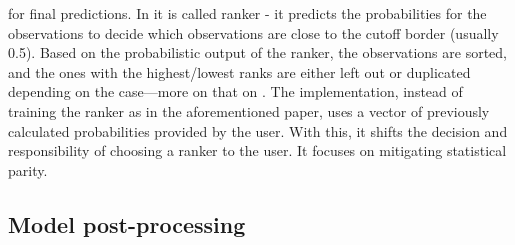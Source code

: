 \begin{itemize}
  for final predictions. In \citet{kamiran} it is called ranker - it
  predicts the probabilities for the observations to decide which
  observations are close to the cutoff border (usually 0.5). Based on
  the probabilistic output of the ranker, the observations are sorted,
  and the ones with the highest/lowest ranks are either left out or
  duplicated depending on the case---more on that on \citet{kamiran}.
  The  implementation, instead of training the ranker as
  in the aforementioned paper, uses a vector of previously calculated
  probabilities provided by the user. With this, it shifts the decision
  and responsibility of choosing a ranker to the user. It focuses on
  mitigating statistical parity.
\end{itemize}

\hypertarget{model-post-processing}{%
\subsection{Model post-processing}\label{model-post-processing}}

